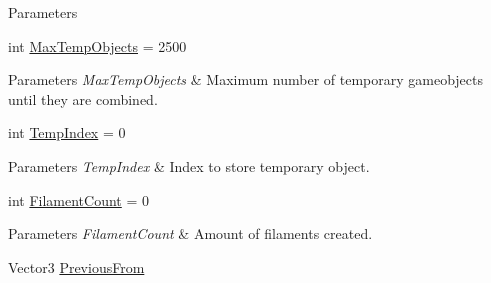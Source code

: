 \begin{DoxyCompactItemize}
\begin{DoxyCompactList}
\begin{DoxyParams}{Parameters}
\hline
\end{DoxyParams}
\end{DoxyCompactList}\item 
\mbox{\label{class_filament_manager_ae8591a3fbaae0dffffd99eb1ffd6416f}} 
int \hyperlink{class_filament_manager_ae8591a3fbaae0dffffd99eb1ffd6416f}{Max\+Temp\+Objects} = 2500
\begin{DoxyCompactList}\small\item\em 
\begin{DoxyParams}{Parameters}
{\em Max\+Temp\+Objects} & Maximum number of temporary gameobjects until they are combined.\\
\hline
\end{DoxyParams}
\end{DoxyCompactList}\item 
\mbox{\label{class_filament_manager_a9608a8f52bbfa6090658273943af3168}} 
int \hyperlink{class_filament_manager_a9608a8f52bbfa6090658273943af3168}{Temp\+Index} = 0
\begin{DoxyCompactList}\small\item\em 
\begin{DoxyParams}{Parameters}
{\em Temp\+Index} & Index to store temporary object.\\
\hline
\end{DoxyParams}
\end{DoxyCompactList}\item 
\mbox{\label{class_filament_manager_a783a989e028c64956987bfb3ca55c782}} 
int \hyperlink{class_filament_manager_a783a989e028c64956987bfb3ca55c782}{Filament\+Count} = 0
\begin{DoxyCompactList}\small\item\em 
\begin{DoxyParams}{Parameters}
{\em Filament\+Count} & Amount of filaments created.\\
\hline
\end{DoxyParams}
\end{DoxyCompactList}\item 
\mbox{\label{class_filament_manager_a209bee6c4f118778aa221fa7642c185f}} 
Vector3 \hyperlink{class_filament_manager_a209bee6c4f118778aa221fa7642c185f}{Previous\+From}
\begin{DoxyCompactList}\small\item\em 

\end{DoxyCompactList}
\end{DoxyCompactItemize}
